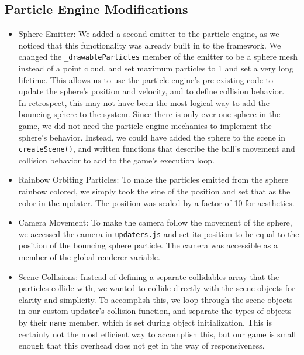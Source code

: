 \documentclass[a4paper]{article}
\begin{document}
\subsection{Particle Engine Modifications}
\begin{itemize}
	\item Sphere Emitter: We added a second emitter to the particle engine, as we noticed that this functionality was already built in to the framework. We changed the \texttt{\_drawableParticles} member of the emitter to be a sphere mesh instead of a point cloud, and set maximum particles to 1 and set a very long lifetime. This allows us to use the particle engine's pre-existing code to update the sphere's position and velocity, and to define collision behavior. \\
	In retrospect, this may not have been the most logical way to add the bouncing sphere to the system. Since there is only ever one sphere in the game, we did not need the particle engine mechanics to implement the sphere's behavior. Instead, we could have added the sphere to the scene in \texttt{createScene()}, and written functions that describe the ball's movement and collision behavior to add to the game's execution loop.
	\item Rainbow Orbiting Particles: To make the particles emitted from the sphere rainbow colored, we simply took the sine of the position and set that as the color in the updater. The position was scaled by a factor of 10 for aesthetics. 
	\item Camera Movement: To make the camera follow the movement of the sphere, we accessed the camera in \texttt{updaters.js} and set its position to be equal to the position of the bouncing sphere particle. The camera was accessible as a member of the global renderer variable.
	\item Scene Collisions: Instead of defining a separate collidables array that the particles collide with, we wanted to collide directly with the scene objects for clarity and simplicity. To accomplish this, we loop through the scene objects in our custom updater's collision function, and separate the types of objects by their \texttt{name} member, which is set during object initialization. This is certainly not the most efficient way to accomplish this, but our game is small enough that this overhead does not get in the way of responsiveness.
\end{itemize}
\end{document}

